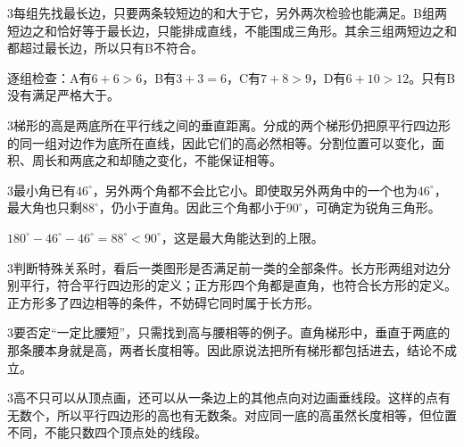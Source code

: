 \documentclass[multi=snippet,border={5bp 20bp 5bp 5bp}]{standalone}
\newenvironment{snippet}[3]{\begin{minipage}{#1bp}\color{answerred}\fontsize{#2}{#3}\selectfont\raggedright}{\end{minipage}}
\begin{document}
\begin{snippet}{505}{11.5}{14}\begin{multicols}{3}\raggedcolumns 每组先找最长边，只要两条较短边的和大于它，另外两次检验也能满足。B组两短边之和恰好等于最长边，只能排成直线，不能围成三角形。其余三组两短边之和都超过最长边，所以只有B不符合。\par 逐组检查：A有\(6+6>6\)\allowbreak ，B有\(3+3=6\)\allowbreak ，C有\(7+8>9\)\allowbreak ，D有\(6+10>12\)\allowbreak 。只有B没有满足严格大于。\end{multicols}\end{snippet}
\begin{snippet}{505}{11.5}{14}\begin{multicols}{3}\raggedcolumns 梯形的高是两底所在平行线之间的垂直距离。分成的两个梯形仍把原平行四边形的同一组对边作为底所在直线，因此它们的高必然相等。分割位置可以变化，面积、周长和两底之和却随之变化，不能保证相等。\end{multicols}\end{snippet}
\begin{snippet}{505}{11.5}{14}\begin{multicols}{3}\raggedcolumns 最小角已有\(46^\circ\)\allowbreak ，另外两个角都不会比它小。即使取另外两角中的一个也为\(46^\circ\)\allowbreak ，最大角也只剩\(88^\circ\)\allowbreak ，仍小于直角。因此三个角都小于\(90^\circ\)\allowbreak ，可确定为锐角三角形。\par \(180^\circ-46^\circ-46^\circ=88^\circ<90^\circ\)\allowbreak ，这是最大角能达到的上限。\end{multicols}\end{snippet}
\begin{snippet}{505}{11.5}{14}\begin{multicols}{3}\raggedcolumns 判断特殊关系时，看后一类图形是否满足前一类的全部条件。长方形两组对边分别平行，符合平行四边形的定义；正方形四个角都是直角，也符合长方形的定义。正方形多了四边相等的条件，不妨碍它同时属于长方形。\end{multicols}\end{snippet}
\begin{snippet}{505}{11.5}{14}\begin{multicols}{3}\raggedcolumns 要否定“一定比腰短”，只需找到高与腰相等的例子。直角梯形中，垂直于两底的那条腰本身就是高，两者长度相等。因此原说法把所有梯形都包括进去，结论不成立。\end{multicols}\end{snippet}
\begin{snippet}{505}{11.5}{14}\begin{multicols}{3}\raggedcolumns 高不只可以从顶点画，还可以从一条边上的其他点向对边画垂线段。这样的点有无数个，所以平行四边形的高也有无数条。对应同一底的高虽然长度相等，但位置不同，不能只数四个顶点处的线段。\end{multicols}\end{snippet}
\end{document}
